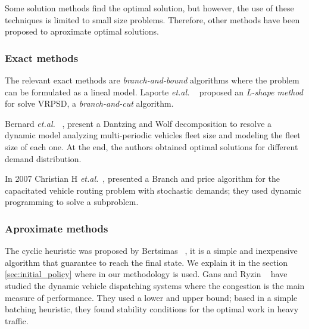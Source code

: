 Some solution methods find the optimal solution, but however, the use of these techniques is limited to small size problems. Therefore, other methods have been proposed to aproximate optimal solutions.



\subsubsection{Exact methods}

The relevant exact methods are \textit{branch-and-bound} algorithms where the problem can be formulated as a lineal model. Laporte \textit{et.al.} ~\cite{laporte_integer_2002} proposed an \textit{L-shape method} for solve VRPSD, a \textit{branch-and-cut} algorithm.

Bernard \textit{et.al.} ~\cite{cheung_dynamic_2008},  present a Dantzing and Wolf decomposition to resolve a dynamic model analyzing multi-periodic vehicles fleet size and modeling the fleet size of each one. At the end, the authors obtained optimal solutions for different demand distribution.

In 2007 Christian H \textit{et.al.}~\cite{christiansen_branch-and-price_2007}, presented a Branch and price algorithm for the capacitated vehicle routing problem with stochastic demands; they used dynamic programming to solve a subproblem.

\subsubsection{Aproximate methods}

The cyclic heuristic was proposed by Bertsimas ~\cite{bertsimas_vehicle_1992}, it is a simple and inexpensive algorithm that guarantee to reach the final state. We explain it in the section \ref{sec:initial_policy} where in our methodology is used. Gans and Ryzin ~\cite{Gans_1999} have studied the dynamic vehicle dispatching systems where the congestion is the main measure of performance. They used a lower and upper bound; based in a simple batching heuristic, they found stability conditions for the optimal work in heavy traffic.

